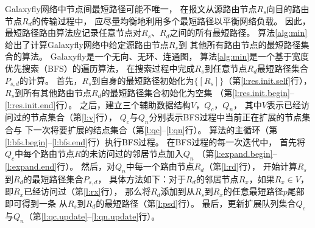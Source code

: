 Galaxyfly网络中节点间最短路径可能不唯一，
在报文从源路由节点$R_s$向目的路由节点$R_d$的传输过程中，
应尽量均衡地利用多个最短路径以平衡网络负载。
因此，最短路径路由算法应记录任意节点对$R_s$、$R_d$之间的所有最短路径。
算法\ref{alg:min}给出了计算Galaxyfly网络中给定源路由节点$R_s$到
其他所有路由节点的最短路径集合的算法。
Galaxyfly是一个无向、无环、连通图，
算法\ref{alg:min}是一个基于宽度优先搜索（BFS）的遍历算法，
在搜索过程中完成$R_s$到任意节点$R_d$最短路径集合$P_{s,d}$的计算。
首先，$R_s$到自身的最短路径初始化为$\{[R_s]\}$（第\ref{l:res.init.self}行），
$R_s$到所有其他路由节点$R_d$的最短路径集合初始化为空集
（第\ref{l:res.init.begin}--\ref{l:res.init.end}行）。
之后，建立三个辅助数据结构$V$，$Q_c$，$Q_n$，
其中$V$表示已经访问过的节点集合（第\ref{l:v}行），
$Q_c$与$Q_n$分别表示BFS过程中当前正在扩展的节点集合与
下一次将要扩展的结点集合（第\ref{l:qc}--\ref{l:qn}行）。
算法的主循环（第\ref{l:bfs.begin}--\ref{l:bfs.end}行）执行BFS过程。
在BFS过程的每一次迭代中，
首先将$Q_c$中每个路由节点$R$的未访问过的邻居节点加入$Q_n$
（第\ref{l:expand.begin}--\ref{l:expand.end}行）。
然后，对$Q_n$中每一个路由节点$R_d$（第\ref{l:rd}行），
开始计算$R_s$到$R_d$的最短路径集合$P_{s,d}$，
具体方法如下：对于$R_d$的邻居节点$R_x$，如果$R_x \in V$，即$R_x$已经访问过（第\ref{l:rx}行），
那么将$R_d$添加到从$R_s$到$R_x$的任意最短路径$p$尾部即可得到一条
从$R_s$到$R_d$的最短路径（第\ref{l:psd}行）。
最后，更新扩展队列集合$Q_c$与$Q_n$（第\ref{l:qc.update}--\ref{l:qn.update}行）。

